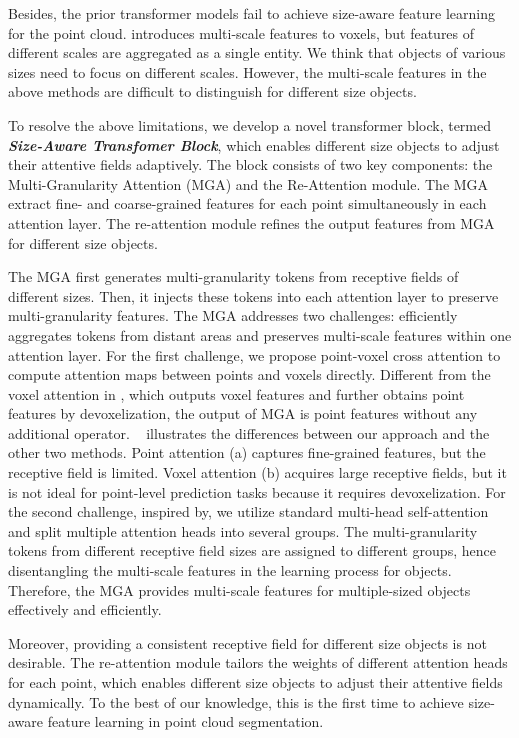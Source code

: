 \documentclass[10pt,twocolumn,letterpaper]{article}
\begin{document}
Besides, the prior transformer models fail to achieve size-aware feature learning for the point cloud. \cite{patchformer2022} introduces multi-scale features to voxels, but features of different scales are aggregated as a single entity. We think that objects of various sizes need to focus on different scales. However, the multi-scale features in the above methods are difficult to distinguish for different size objects.




To resolve the above limitations, we develop a novel transformer block, termed \textbf{\textit{Size-Aware Transfomer Block}}, which enables different size objects to adjust their attentive fields adaptively. The block consists of two key components: the Multi-Granularity Attention (MGA) and the Re-Attention module. The MGA extract fine- and coarse-grained features for each point simultaneously in each attention layer. The re-attention module refines the output features from MGA for different size objects. 

The MGA first generates multi-granularity tokens from receptive fields of different sizes. Then, it injects these tokens into each attention layer to preserve multi-granularity features. The MGA addresses two challenges: efficiently aggregates tokens from distant areas and preserves multi-scale features within one attention layer. For the first challenge, we propose point-voxel cross attention to compute attention maps between points and voxels directly. Different from the voxel attention in \cite{pvt2021,crossscaletrans2022,patchformer2022}, which outputs voxel features and further obtains point features by devoxelization, the output of MGA is point features without any additional operator. ~ illustrates the differences between our approach and the other two methods. Point attention (a) captures fine-grained features, but the receptive field is limited. Voxel attention (b) acquires large receptive fields, but it is not ideal for point-level prediction tasks because it requires devoxelization. For the second challenge, inspired by\cite{shunted2d2022}, we utilize standard multi-head self-attention and split multiple attention heads into several groups. The multi-granularity tokens from different receptive field sizes are assigned to different groups, hence disentangling the multi-scale features in the learning process for objects. 
Therefore, the MGA provides multi-scale features for multiple-sized objects effectively and efficiently.

Moreover, providing a consistent receptive field for different size objects is not desirable. The re-attention module tailors the weights of different attention heads for each point, which enables different size objects to adjust their attentive fields dynamically. To the best of our knowledge, this is the first time to achieve size-aware feature learning in point cloud segmentation.
\end{document}
